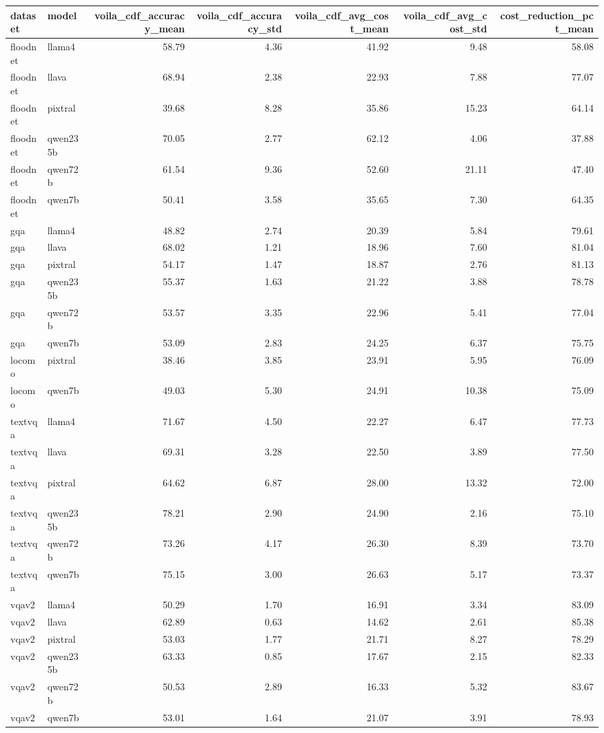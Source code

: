 \begin{tabular}{llrrrrr}
\toprule
dataset & model & voila_cdf_accuracy_mean & voila_cdf_accuracy_std & voila_cdf_avg_cost_mean & voila_cdf_avg_cost_std & cost_reduction_pct_mean \\
\midrule
floodnet & llama4 & 58.79 & 4.36 & 41.92 & 9.48 & 58.08 \\
floodnet & llava & 68.94 & 2.38 & 22.93 & 7.88 & 77.07 \\
floodnet & pixtral & 39.68 & 8.28 & 35.86 & 15.23 & 64.14 \\
floodnet & qwen235b & 70.05 & 2.77 & 62.12 & 4.06 & 37.88 \\
floodnet & qwen72b & 61.54 & 9.36 & 52.60 & 21.11 & 47.40 \\
floodnet & qwen7b & 50.41 & 3.58 & 35.65 & 7.30 & 64.35 \\
gqa & llama4 & 48.82 & 2.74 & 20.39 & 5.84 & 79.61 \\
gqa & llava & 68.02 & 1.21 & 18.96 & 7.60 & 81.04 \\
gqa & pixtral & 54.17 & 1.47 & 18.87 & 2.76 & 81.13 \\
gqa & qwen235b & 55.37 & 1.63 & 21.22 & 3.88 & 78.78 \\
gqa & qwen72b & 53.57 & 3.35 & 22.96 & 5.41 & 77.04 \\
gqa & qwen7b & 53.09 & 2.83 & 24.25 & 6.37 & 75.75 \\
locomo & pixtral & 38.46 & 3.85 & 23.91 & 5.95 & 76.09 \\
locomo & qwen7b & 49.03 & 5.30 & 24.91 & 10.38 & 75.09 \\
textvqa & llama4 & 71.67 & 4.50 & 22.27 & 6.47 & 77.73 \\
textvqa & llava & 69.31 & 3.28 & 22.50 & 3.89 & 77.50 \\
textvqa & pixtral & 64.62 & 6.87 & 28.00 & 13.32 & 72.00 \\
textvqa & qwen235b & 78.21 & 2.90 & 24.90 & 2.16 & 75.10 \\
textvqa & qwen72b & 73.26 & 4.17 & 26.30 & 8.39 & 73.70 \\
textvqa & qwen7b & 75.15 & 3.00 & 26.63 & 5.17 & 73.37 \\
vqav2 & llama4 & 50.29 & 1.70 & 16.91 & 3.34 & 83.09 \\
vqav2 & llava & 62.89 & 0.63 & 14.62 & 2.61 & 85.38 \\
vqav2 & pixtral & 53.03 & 1.77 & 21.71 & 8.27 & 78.29 \\
vqav2 & qwen235b & 63.33 & 0.85 & 17.67 & 2.15 & 82.33 \\
vqav2 & qwen72b & 50.53 & 2.89 & 16.33 & 5.32 & 83.67 \\
vqav2 & qwen7b & 53.01 & 1.64 & 21.07 & 3.91 & 78.93 \\
\bottomrule
\end{tabular}
